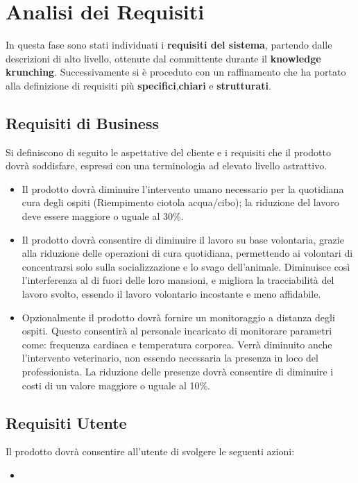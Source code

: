 
\chapter{Analisi dei Requisiti}
In questa fase sono stati individuati i \textbf{requisiti del sistema}, partendo dalle descrizioni di alto livello, ottenute dal committente durante il \textbf{knowledge krunching}. Successivamente si è proceduto con un raffinamento che ha portato alla definizione di requisiti più \textbf{specifici},\textbf{chiari} e \textbf{strutturati}.
	\section{Requisiti di Business}
	Si definiscono di seguito le aspettative del cliente e i requisiti che il prodotto dovrà soddisfare, espressi con una terminologia ad elevato livello astrattivo.
        \begin{itemize}
            \item Il prodotto dovrà diminuire l'intervento umano necessario per la quotidiana cura degli ospiti (Riempimento ciotola acqua/cibo); la riduzione del lavoro deve essere maggiore o uguale al 30\%.
            \item Il prodotto dovrà consentire di diminuire il lavoro su base volontaria, grazie alla riduzione delle operazioni di cura quotidiana, permettendo ai volontari di concentrarsi solo sulla socializzazione e lo svago dell'animale.
            Diminuisce così l'interferenza al di fuori delle loro mansioni, e migliora la tracciabilità del lavoro svolto, essendo il lavoro volontario incostante e meno affidabile.
            \item Opzionalmente il prodotto dovrà fornire un monitoraggio a distanza degli ospiti.
            Questo consentirà al personale incaricato di monitorare parametri come: frequenza cardiaca e temperatura corporea. Verrà diminuito anche l'intervento veterinario, non essendo necessaria la presenza in loco del professionista. La riduzione delle presenze dovrà consentire di diminuire i costi di un valore maggiore o uguale al 10\%.
        \end{itemize}
	
	\section{Requisiti Utente}
	Il prodotto dovrà consentire all'utente di svolgere le seguenti azioni:
	   \begin{itemize}
            \item %
        \end{itemize}
